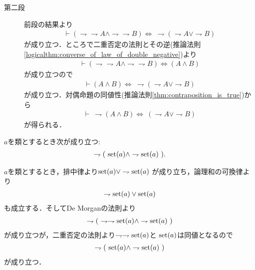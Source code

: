 \begin{prf}
\begin{description}
			\item[第二段]
				前段の結果より
				\begin{align}
					\vdash (\rightharpoondown \rightharpoondown A \wedge \rightharpoondown \rightharpoondown B)
					\Longleftrightarrow\ \rightharpoondown (\rightharpoondown A \vee \rightharpoondown B)
				\end{align}
				が成り立つ．ところで二重否定の法則とその逆(推論法則\ref{logicalthm:converse_of_law_of_double_negative})より
				\begin{align}
					\vdash (\rightharpoondown \rightharpoondown A \wedge \rightharpoondown \rightharpoondown B)
					\Longleftrightarrow (A \wedge B)
				\end{align}
				が成り立つので
				\begin{align}
					\vdash (A \wedge B) 
					\Longleftrightarrow\ \rightharpoondown (\rightharpoondown A \vee \rightharpoondown B)
				\end{align}
				が成り立つ．対偶命題の同値性(推論法則\ref{thm:contraposition_is_true})から
				\begin{align}
					\vdash\ \rightharpoondown (A \wedge B)
					\Longleftrightarrow\ (\rightharpoondown A \vee \rightharpoondown B)
				\end{align}
				が得られる．
				\QED
		\end{description}
	\end{prf}
	
	
	\begin{screen}
		\begin{thm}[集合であり真類でもある類は存在しない]
			$a$を類とするとき次が成り立つ:
			\begin{align}
				\rightharpoondown (\ \operatorname*{set} (a) \wedge \rightharpoondown \operatorname*{set} (a)\ ).
			\end{align}
		\end{thm}
	\end{screen}
	
	\begin{prf}
		$a$を類とするとき，排中律より$\operatorname*{set} (a) \vee \rightharpoondown \operatorname*{set} (a)$
		が成り立ち，論理和の可換律より
		\begin{align}
			\rightharpoondown \operatorname*{set} (a) \vee \operatorname*{set} (a)
		\end{align}
		も成立する．そしてDe Morganの法則より
		\begin{align}
			\rightharpoondown (\ \rightharpoondown \rightharpoondown \operatorname*{set} (a) \wedge \rightharpoondown \operatorname*{set} (a)\ )
		\end{align}
		が成り立つが，二重否定の法則より$\rightharpoondown \rightharpoondown \operatorname*{set} (a)$と
		$\operatorname*{set} (a)$は同値となるので
		\begin{align}
			\rightharpoondown (\ \operatorname*{set} (a) \wedge \rightharpoondown \operatorname*{set} (a)\ )
		\end{align}
		が成り立つ．
		\QED
	\end{prf}
	
